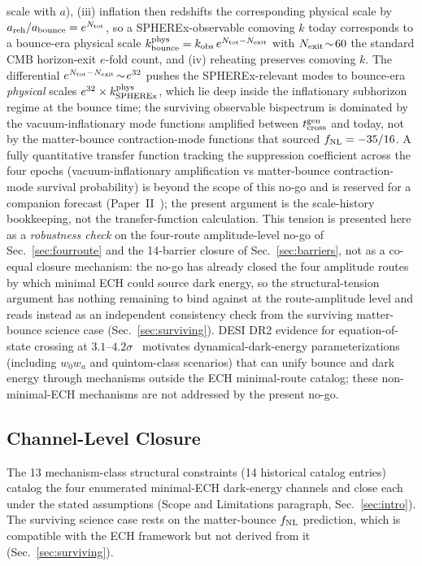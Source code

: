 \documentclass[aps,prd,twocolumn,superscriptaddress,showpacs,preprintnumbers,nofootinbib,longbibliography,floatfix]{revtex4-2}
\newcommand{\fnl}{f_{\rm NL}}
\begin{document}
scale with $a$), (iii) inflation then redshifts the corresponding
physical scale by $a_{\rm reh}/a_{\rm bounce}=e^{N_{\rm tot}}$, so a
SPHEREx-observable comoving $k$ today corresponds to a bounce-era
physical scale $k_{\rm bounce}^{\rm phys}=k_{\rm obs}\,e^{N_{\rm tot}-N_{\rm exit}}$
with $N_{\rm exit}\!\sim\!60$ the standard CMB horizon-exit $e$-fold
count, and (iv) reheating preserves comoving $k$. The differential
$e^{N_{\rm tot}-N_{\rm exit}}\!\sim\!e^{32}$ pushes the SPHEREx-relevant
modes to bounce-era \emph{physical} scales $e^{32}\times k_{\rm SPHEREx}^{\rm phys}$,
which lie deep inside the inflationary subhorizon regime at the bounce
time; the surviving observable bispectrum is dominated by the
vacuum-inflationary mode functions amplified between $t_{\rm cross}^{\rm gen}$
and today, not by the matter-bounce contraction-mode functions that
sourced $\fnl=-35/16$. A fully quantitative transfer function tracking
the suppression coefficient across the four epochs (vacuum-inflationary
amplification vs matter-bounce contraction-mode survival probability) is
beyond the scope of this no-go and is reserved for a companion forecast
(Paper~II~\cite{Golden2026P2}); the present argument is the
scale-history bookkeeping, not the transfer-function calculation.
This tension is presented here as a \emph{robustness
check} on the four-route amplitude-level no-go of Sec.~\ref{sec:fourroute}
and the 14-barrier closure of Sec.~\ref{sec:barriers}, not as a co-equal
closure mechanism: the no-go has already closed the four amplitude routes
by which minimal ECH could source dark energy, so the structural-tension
argument has nothing remaining to bind against at the route-amplitude level
and reads instead as an independent consistency check from the surviving
matter-bounce science case (Sec.~\ref{sec:surviving}). DESI DR2 evidence for
equation-of-state crossing at $3.1$--$4.2\sigma$~\cite{DESI2025DR2}
motivates dynamical-dark-energy parameterizations (including
$w_0w_a$ and quintom-class scenarios) that can unify bounce and dark energy
through mechanisms outside the ECH minimal-route catalog; these non-minimal-ECH
mechanisms are not addressed by the present no-go.

\subsection{Channel-Level Closure}\label{sec:ech_closure}

The 13 mechanism-class structural constraints (14 historical catalog
entries) catalog the four enumerated minimal-ECH dark-energy channels and
close each under the stated assumptions (Scope and Limitations paragraph,
Sec.~\ref{sec:intro}). The surviving science case rests on the
matter-bounce $\fnl$ prediction, which is compatible with the ECH
framework but not derived from it (Sec.~\ref{sec:surviving}).
\end{document}
